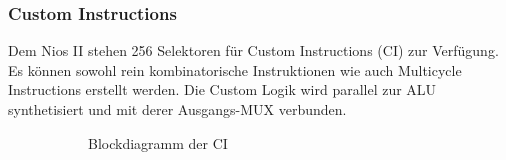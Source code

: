 \documentclass[11pt,a4paper,oneside]{scrartcl}
\begin{document}
\subsubsection{Custom Instructions}
Dem Nios II stehen 256 Selektoren für Custom Instructions (CI) zur Verfügung. Es können sowohl rein kombinatorische Instruktionen wie auch Multicycle Instructions erstellt werden. Die Custom Logik wird parallel zur ALU synthetisiert und mit derer Ausgangs-MUX verbunden.
\newpage
\begin{figure}[ht!]
\centering
{}
\begin{subfigure}[b]{0.4\textwidth}
    \centering
    \usebox{\largestimage}
\caption{Blockdiagramm  der CI}
 \end{subfigure}
 \begin{subfigure}[b]{0.4\textwidth}
 \centering
    \raisebox{\dimexpr.5\ht\largestimage-.5\height}{%
}
\end{subfigure}
\end{figure}
\end{document}
